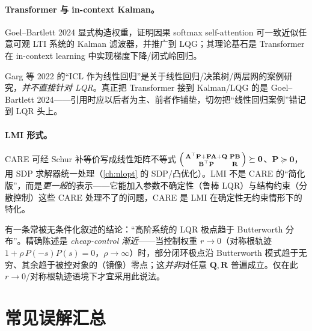 \paragraph{Transformer 与 in-context Kalman。}Goel--Bartlett 2024\cite{goel2024transformer} 显式构造权重，证明因果 softmax self-attention 可一致近似任意可观 LTI 系统的 Kalman 滤波器，并推广到 LQG；其理论基石是 Transformer 在 in-context learning 中实现梯度下降/闭式岭回归\cite{garg2022what,akyurek2023what}。

\begin{pitfall}
Garg 等 2022\cite{garg2022what} 的“ICL 作为线性回归”是关于线性回归/决策树/两层网的案例研究，\emph{并不直接针对 LQR}。真正把 Transformer 接到 Kalman/LQG 的是 Goel--Bartlett 2024\cite{goel2024transformer}——引用时应以后者为主、前者作铺垫，切勿把“线性回归案例”错记到 LQR 头上。
\end{pitfall}

\paragraph{LMI 形式。}CARE 可经 Schur 补等价写成线性矩阵不等式 $\begin{psmallmatrix}\mathbf A^\top\mathbf P+\mathbf P\mathbf A+\mathbf Q&\mathbf P\mathbf B\\\mathbf B^\top\mathbf P&\mathbf R\end{psmallmatrix}\succeq\mathbf0$、$\mathbf P\succeq\mathbf0$，用 SDP 求解器统一处理（\cref{ch:nlopt} 的 SDP/凸优化）。LMI 不是 CARE 的“简化版”，而是\emph{更一般}的表示——它能加入参数不确定性（鲁棒 LQR）与结构约束（分散控制）这些 CARE 处理不了的问题，CARE 是 LMI 在确定性无约束情形下的特化。

\begin{remark}
有一条常被无条件化叙述的结论：“高阶系统的 LQR 极点趋于 Butterworth 分布”。精确陈述是 \emph{cheap-control 渐近}——当控制权重 $r\to0$（对称根轨迹 $1+\rho\,P(-s)P(s)=0$，$\rho\to\infty$）时，部分闭环极点沿 Butterworth 模式趋于无穷、其余趋于被控对象的（镜像）零点；这\emph{并非}对任意 $\mathbf Q,\mathbf R$ 普遍成立。仅在此 $r\to0$/对称根轨迹语境下才宜采用此说法。
\end{remark}

\section*{常见误解汇总}

